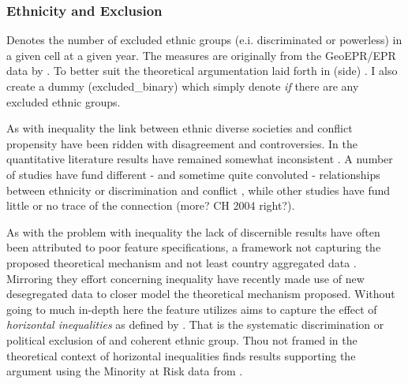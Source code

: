 \documentclass[a4paper]{article}
\begin{document}
\subsubsection{Ethnicity and Exclusion}




Denotes the number of excluded ethnic groups (e.i. discriminated or powerless) in a given cell at a given year. The measures are originally from the GeoEPR/EPR data by \cite{Vogt_2015}. To better suit the theoretical argumentation laid forth in \cite{Cederman_Gleditsch_Buhaug_2013}(side) \citep{prio_code_2015}. I also create a dummy (excluded\_binary) which simply denote \emph{if} there are any excluded ethnic groups. 

As with inequality the link between ethnic diverse societies and conflict propensity have been ridden with disagreement and controversies. In the quantitative literature results have remained somewhat inconsistent \citep[23-24]{Blattman_Miguel_2010}. A number of studies have fund different - and sometime quite convoluted - relationships between ethnicity or discrimination and conflict \citep{Collier_Hoeffler_1998, Fearon_2004, Blimes_2006, Hegre_Sambanis_2006, Goldstone_2010}, while other studies have fund little or no trace of the connection \citep{Fearon_Laitin_2003, Collier_Hoeffler_2004}(more? CH 2004 right?).\par 

As with the problem with inequality the lack of discernible results have often been attributed to poor feature specifications, a framework not capturing the proposed theoretical mechanism and not least country aggregated data \citep{Blimes_2006, Blattman_Miguel_2010, Cederman_Gleditsch_Buhaug_2013}. Mirroring they effort concerning inequality \cite{Cederman_Gleditsch_Buhaug_2013} have recently made use of new desegregated data \citep{Girardin_2015} to closer model the theoretical mechanism proposed. Without going to much in-depth here the feature \cite{Cederman_Gleditsch_Buhaug_2013} utilizes aims to capture the effect of \emph{horizontal inequalities} as defined by \citep[31-35]{Cederman_Gleditsch_Buhaug_2013}. That is the systematic discrimination or political exclusion of and coherent ethnic group. Thou not framed in the theoretical context of horizontal inequalities \cite{Goldstone_2010} finds results supporting the argument using the Minority at Risk data from \cite{Gurr_1995}.\par
\end{document}
